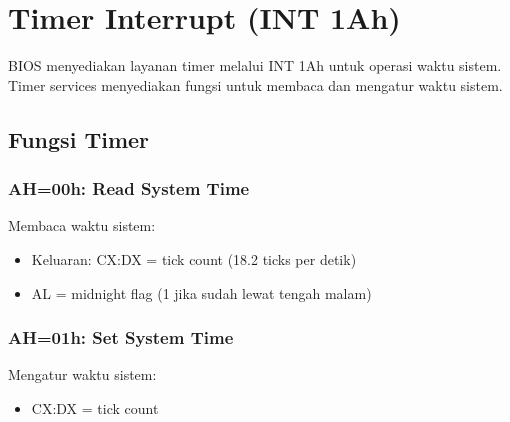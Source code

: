 \documentclass[../main.tex]{subfiles}
\begin{document}
    \section{Timer Interrupt (INT 1Ah)}
        BIOS menyediakan layanan timer melalui INT 1Ah untuk operasi waktu sistem. Timer services menyediakan fungsi untuk membaca dan mengatur waktu sistem.

        \subsection{Fungsi Timer}
            \subsubsection{AH=00h: Read System Time}
                Membaca waktu sistem:
                \begin{itemize}
                    \item Keluaran: CX:DX = tick count (18.2 ticks per detik)
                    \item AL = midnight flag (1 jika sudah lewat tengah malam)
                \end{itemize}

            \subsubsection{AH=01h: Set System Time}
                Mengatur waktu sistem:
                \begin{itemize}
                    \item CX:DX = tick count
                \end{itemize}
\end{document}
